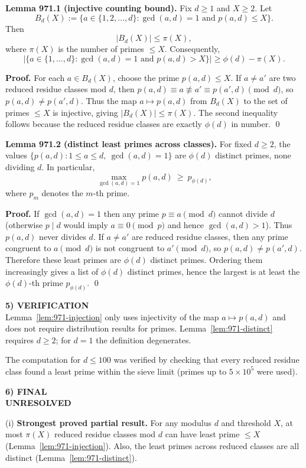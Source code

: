\medskip
\noindent\textbf{Lemma 971.1 (injective counting bound).}\label{lem:971-injection}
Fix $d\ge 1$ and $X\ge 2$.
Let
\[
B_d(X):=\{a\in\{1,2,\dots,d\}: \gcd(a,d)=1\text{ and } p(a,d)\le X\}.
\]
Then
\[
|B_d(X)|\le \pi(X),
\]
where $\pi(X)$ is the number of primes $\le X$.  Consequently,
\[
|\{a\in\{1,\dots,d\}: \gcd(a,d)=1\text{ and }p(a,d)>X\}|\ge \phi(d)-\pi(X).
\]

\noindent\textbf{Proof.}
For each $a\in B_d(X)$, choose the prime $p(a,d)\le X$.
If $a\ne a'$ are two reduced residue classes mod $d$, then $p(a,d)\equiv a\not\equiv a'\equiv p(a',d)\pmod d$, so $p(a,d)\ne p(a',d)$.
Thus the map $a\mapsto p(a,d)$ from $B_d(X)$ to the set of primes $\le X$ is injective, giving $|B_d(X)|\le \pi(X)$.
The second inequality follows because the reduced residue classes are exactly $\phi(d)$ in number. \qed

\medskip
\noindent\textbf{Lemma 971.2 (distinct least primes across classes).}\label{lem:971-distinct}
For fixed $d\ge 2$, the values $\{p(a,d): 1\le a\le d,\ \gcd(a,d)=1\}$ are $\phi(d)$ distinct primes, none dividing $d$.
In particular,
\[
\max_{\gcd(a,d)=1} p(a,d)\ \ge\ p_{\phi(d)},
\]
where $p_m$ denotes the $m$-th prime.

\noindent\textbf{Proof.}
If $\gcd(a,d)=1$ then any prime $p\equiv a\pmod d$ cannot divide $d$ (otherwise $p\mid d$ would imply $a\equiv 0\pmod p$ and hence $\gcd(a,d)>1$).  Thus $p(a,d)$ never divides $d$.
If $a\ne a'$ are reduced residue classes, then any prime congruent to $a\pmod d$ is not congruent to $a'\pmod d$, so $p(a,d)\ne p(a',d)$.  Therefore these least primes are $\phi(d)$ distinct primes.
Ordering them increasingly gives a list of $\phi(d)$ distinct primes, hence the largest is at least the $\phi(d)$-th prime $p_{\phi(d)}$. \qed

\medskip
\noindent\textbf{5) VERIFICATION}\\
Lemma~\ref{lem:971-injection} only uses injectivity of the map $a\mapsto p(a,d)$ and does not require distribution results for primes.
Lemma~\ref{lem:971-distinct} requires $d\ge 2$; for $d=1$ the definition degenerates.

The computation for $d\le 100$ was verified by checking that every reduced residue class found a least prime within the sieve limit (primes up to $5\times 10^5$ were used).

\medskip
\noindent\textbf{6) FINAL}\\
\textbf{UNRESOLVED}

(i) \textbf{Strongest proved partial result.} For any modulus $d$ and threshold $X$, at most $\pi(X)$ reduced residue classes mod $d$ can have least prime $\le X$ (Lemma~\ref{lem:971-injection}).  Also, the least primes across reduced classes are all distinct (Lemma~\ref{lem:971-distinct}).

